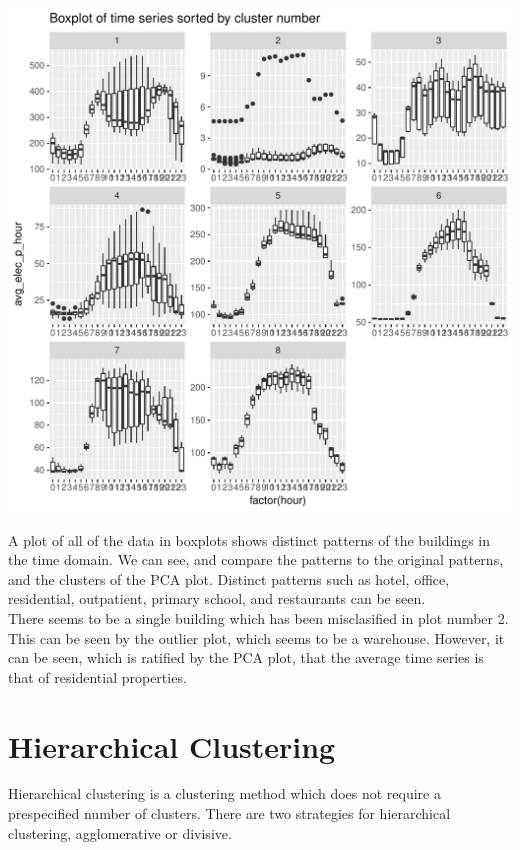 \documentclass[12pt]{article}\usepackage[]{graphicx}\usepackage[]{color}
\makeatletter
\def\maxwidth{ %
  \ifdim\Gin@nat@width>\linewidth
    \linewidth
  \else
    \Gin@nat@width
  \fi
}
\newenvironment{knitrout}{}{} %
\makeatother
\begin{document}
\begin{knitrout}
\color{fgcolor}
\includegraphics[width=\maxwidth]{figure/boxplot-1} 

\end{knitrout}

A plot of all of the data in boxplots shows distinct patterns of the buildings in the time domain. We can see, and compare the patterns to the original patterns, and the clusters of the PCA plot. Distinct patterns such as hotel, office, residential, outpatient, primary school, and restaurants can be seen. \\

There seems to be a single building which has been misclasified in plot number 2. This can be seen by the outlier plot, which seems to be a warehouse. However, it can be seen, which is ratified by the PCA plot, that the average time series is that of residential properties. 


\section{Hierarchical Clustering}

Hierarchical clustering is a clustering method which does not require a prespecified number of clusters. There are two strategies for hierarchical clustering, agglomerative or divisive.\\
\end{document}

